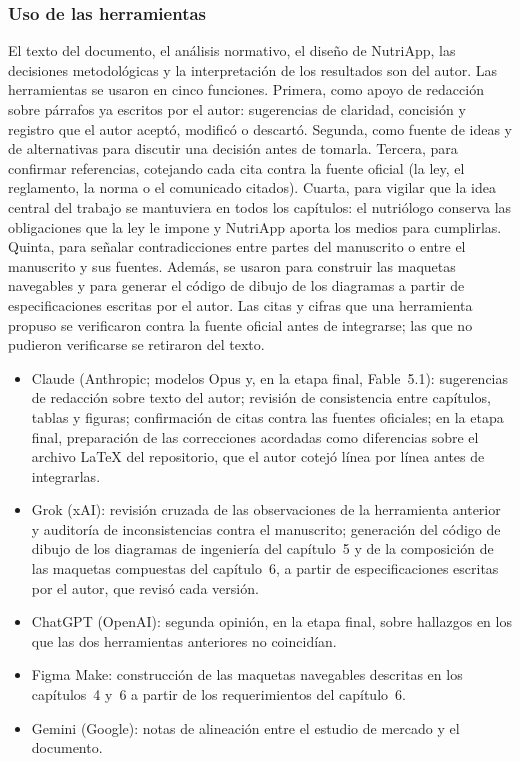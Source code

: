 \documentclass[12pt, a4paper]{article}
\begin{document}
\subsubsection*{Uso de las herramientas}
 
El texto del documento, el análisis normativo, el diseño de NutriApp,
las decisiones metodológicas y la interpretación de los resultados son
del autor. Las herramientas se usaron en cinco funciones. Primera, como
apoyo de redacción sobre párrafos ya escritos por el autor: sugerencias
de claridad, concisión y registro que el autor aceptó, modificó o
descartó. Segunda, como fuente de ideas y de alternativas para discutir
una decisión antes de tomarla. Tercera, para confirmar referencias,
cotejando cada cita contra la fuente oficial (la ley, el reglamento, la
norma o el comunicado citados). Cuarta, para vigilar que la idea central
del trabajo se mantuviera en todos los capítulos: el nutriólogo conserva
las obligaciones que la ley le impone y NutriApp aporta los medios para
cumplirlas. Quinta, para señalar contradicciones entre partes
del manuscrito o entre el manuscrito y sus fuentes. Además, se usaron
para construir las maquetas navegables y para generar el código de
dibujo de los diagramas a partir de especificaciones escritas por el
autor. Las citas y cifras que una herramienta propuso se verificaron
contra la fuente oficial antes de integrarse; las que no pudieron
verificarse se retiraron del texto.
 
\begin{itemize}
  \item Claude (Anthropic; modelos Opus y, en la etapa final, Fable~5.1):
    sugerencias de redacción sobre texto del autor; revisión de
    consistencia entre capítulos, tablas y figuras; confirmación de
    citas contra las fuentes oficiales; en la etapa final, preparación
    de las correcciones acordadas como diferencias sobre el archivo
    \LaTeX{} del repositorio, que el autor cotejó línea por línea antes
    de integrarlas.
  \item Grok (xAI): revisión cruzada de las observaciones de la
    herramienta anterior y auditoría de inconsistencias contra el
    manuscrito; generación del código de dibujo de los diagramas de
    ingeniería del capítulo~5 y de la composición de las maquetas
    compuestas del capítulo~6, a partir de especificaciones escritas
    por el autor, que revisó cada versión.
  \item ChatGPT (OpenAI): segunda opinión, en la etapa final, sobre
    hallazgos en los que las dos herramientas anteriores no coincidían.
  \item Figma Make: construcción de las maquetas navegables descritas
    en los capítulos~4 y~6 a partir de los requerimientos del
    capítulo~6.
  \item Gemini (Google): notas de alineación entre el estudio de
    mercado y el documento.
\end{itemize}
 
\end{document}
